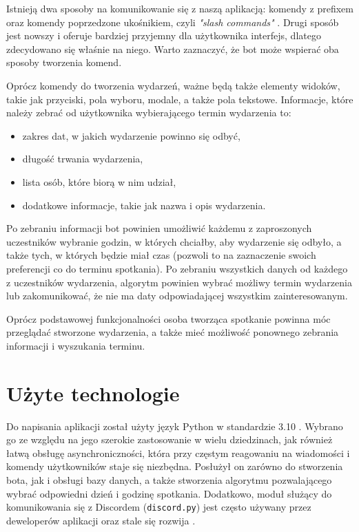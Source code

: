 \documentclass[11pt,a4paper]{article}
\begin{document}
Istnieją dwa sposoby na komunikowanie się z naszą aplikacją: komendy z prefixem oraz komendy poprzedzone ukośnikiem, czyli \textit{"slash commands"} \cite{SlashCommands}. Drugi sposób jest nowszy i oferuje bardziej przyjemny dla użytkownika interfejs, dlatego zdecydowano się właśnie na niego. Warto zaznaczyć, że bot może wspierać oba sposoby tworzenia komend.

Oprócz komendy do tworzenia wydarzeń, ważne będą także elementy widoków, takie jak przyciski, pola wyboru, modale, a także pola tekstowe. Informacje, które należy zebrać od użytkownika wybierającego termin wydarzenia to:
\begin{itemize}
    \item zakres dat, w jakich wydarzenie powinno się odbyć,
    \item długość trwania wydarzenia,
    \item lista osób, które biorą w nim udział,
    \item dodatkowe informacje, takie jak nazwa i opis wydarzenia.
\end{itemize}

Po zebraniu informacji bot powinien umożliwić każdemu z zaproszonych uczestników wybranie godzin, w których chciałby, aby wydarzenie się odbyło, a także tych, w których będzie miał czas (pozwoli to na zaznaczenie swoich preferencji co do terminu spotkania). Po zebraniu wszystkich danych od każdego z uczestników wydarzenia, algorytm powinien wybrać możliwy termin wydarzenia lub zakomunikować, że nie ma daty odpowiadającej wszystkim zainteresowanym.

Oprócz podstawowej funkcjonalności osoba tworząca spotkanie powinna móc przeglądać stworzone wydarzenia, a także mieć możliwość ponownego zebrania informacji i wyszukania terminu.

\section{Użyte technologie}

Do napisania aplikacji został użyty język Python w standardzie 3.10 \cite{PythonRelease}. Wybrano go ze względu na jego szerokie zastosowanie w wielu dziedzinach, jak również łatwą obsługę asynchroniczności, która przy częstym reagowaniu na wiadomości i komendy użytkowników staje się niezbędna. Posłużył on zarówno do stworzenia bota, jak i obsługi bazy danych, a także stworzenia algorytmu pozwalającego wybrać odpowiedni dzień i godzinę spotkania. Dodatkowo, moduł służący do komunikowania się z Discordem (\texttt{discord.py}) jest często używany przez deweloperów aplikacji \cite{} oraz stale się rozwija \cite{}.
\end{document}
